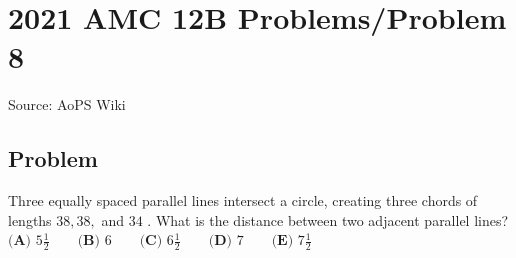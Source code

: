 \documentclass[12pt]{article}
\begin{document}
\section*{{2021 AMC 12B Problems/Problem 8}}
Source: AoPS Wiki

\subsection*{Problem}
Three equally spaced parallel lines intersect a circle, creating three chords of lengths $38,38,$ and $34$ . What is the distance between two adjacent parallel lines? $\textbf{(A) }5\frac12 \qquad \textbf{(B) }6 \qquad \textbf{(C) }6\frac12 \qquad \textbf{(D) }7 \qquad \textbf{(E) }7\frac12$
\end{document}
